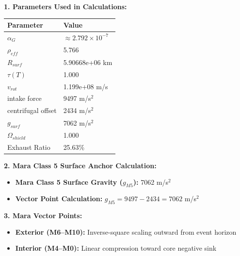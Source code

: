 \documentclass[11pt, a4paper]{article}
\begin{document}
\vspace{0.5em}
\noindent \textbf{1. Parameters Used in Calculations:}
\begin{center}
  \begin{tabular}{|l|l|}
    \hline
    \textbf{Parameter} & \textbf{Value} \\ \hline
    $\alpha_G$ & $\approx 2.792 \times 10^{-7}$ \\ \hline
    $\rho_{eff}$ & 5.766 \\ \hline
    $R_{surf}$ & 5.90668e+06 km \\ \hline
    $\tau(T)$ & 1.000 \\ \hline
    $v_{rot}$ & 1.199e+08 m/s \\ \hline
    intake force & 9497 m/s$^2$ \\ \hline
    centrifugal offset & 2434 m/s$^2$ \\ \hline
    $g_{surf}$ & 7062 m/s$^2$ \\ \hline
    $\Omega_{shield}$ & 1.000 \\ \hline
    Exhaust Ratio & 25.63\% \\ \hline
  \end{tabular}
\end{center}

\vspace{0.5em}
\noindent \textbf{2. Mara Class 5 Surface Anchor Calculation:}
\begin{itemize}
  \item \textbf{Mara Class 5 Surface Gravity ($g_{M5}$):} 7062 m/s$^2$
  \item \textbf{Vector Point Calculation:} $g_{M5} = 9497 - 2434 = 7062$ m/s$^2$
\end{itemize}

\vspace{0.5em}
\noindent \textbf{3. Mara Vector Points:}
\begin{itemize}
  \item \textbf{Exterior (M6--M10):} Inverse-square scaling outward from event horizon
  \item \textbf{Interior (M4--M0):} Linear compression toward core negative sink
\end{itemize}
\end{document}

